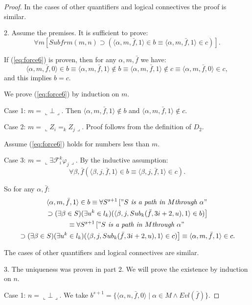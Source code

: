 \documentclass{asl}
\theoremstyle{definition}
\begin{document}
\begin{proof}
In the cases of other quantifiers and logical connectives the proof is similar.

2. Assume the premises. It is sufficient to prove:
\begin{equation}
\forall m\left[Subfrm(m,n)\supset(\langle\alpha,m,\bar{f},1\rangle\in b\equiv\langle\alpha,m,\bar{f},1\rangle\in c)\right]. 
\label{eq:force6}
\end{equation}

If (\ref{eq:force6}) is proven, then for any $\alpha,m,\bar{f}$ we have:
\[\langle\alpha,m,\bar{f},0\rangle\in b\equiv\langle\alpha,m,\bar{f},1\rangle\notin b\equiv\langle\alpha,m,\bar{f},1\rangle\notin c\equiv\langle\alpha,m,\bar{f},0\rangle\in c,\]
and this implies $b=c$.

We prove (\ref{eq:force6}) by induction on $m$.

Case 1: $m=\llcorner\bot\lrcorner$. Then $\langle\alpha,m,\bar{f},1\rangle\notin b$ and $\langle\alpha,m,\bar{f},1\rangle\notin c$.

Case 2: $m=\llcorner Z_i=_k Z_j\lrcorner$. Proof follows from the definition of $D_2$.

Assume (\ref{eq:force6}) holds for numbers less than $m$.

Case 3: $m=\llcorner\exists\mathcal{F}_i^k  \varphi_j\lrcorner$.
By the inductive assumption: 
\[\forall\beta,\bar{f}(\langle\beta,j,\bar{f},1\rangle\in b\equiv\langle\beta,j,\bar{f},1\rangle\in c).\]

So for any $\alpha,\bar{f}$:
\begin{multline*}
\langle\alpha,m,\bar{f},1\rangle\in b
\equiv
\forall S^{s+1}\left["S\textit{ is a path in }M
\textit{through }\alpha" 
\right.
\\
\left.
\supset(\exists\beta\in S)(\exists u^k\in l_k)
(\langle\beta, j,Sub_k(\bar{f},3i+2,u),1\rangle\in b)
\right]
\\
\equiv
\forall S^{s+1}\left["S\textit{ is a path in }M
\textit{through }\alpha" 
\right.
\\
\left.
\supset(\exists\beta\in S)(\exists u^k\in l_k)
(\langle\beta, j,Sub_k(\bar{f},3i+2,u),1\rangle\in c)
\right]
\equiv\langle\alpha,m,\bar{f},1\rangle\in c.
\end{multline*}

The cases of other quantifiers and logical connectives are similar.

3. The uniqueness was proven in part 2. We will prove the existence by induction on $n$.

Case 1: $n=\llcorner\bot\lrcorner$. We take $b^{s+1}=\lbrace\langle\alpha, n,\bar{f},0\rangle\mid\alpha\in M\wedge Evl(\bar{f})\rbrace.$


\end{proof}
\end{document}
